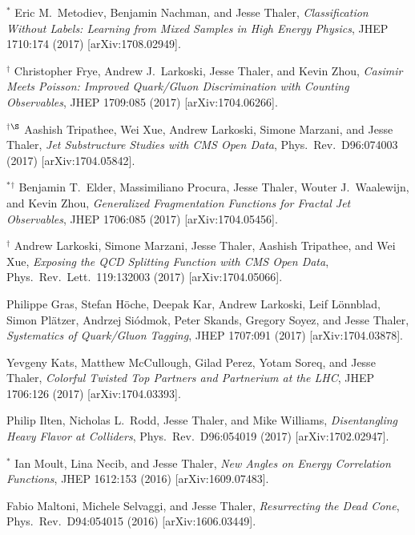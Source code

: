 \begin{list}{[]\addtocounter{jessecount}{-1}}{\leftmargin=3em \itemsep=4pt}
\item
${}^\ast$ Eric M.\ Metodiev, Benjamin Nachman, and Jesse Thaler,
\emph{Classification Without Labels: Learning from Mixed Samples in High Energy Physics},
JHEP 1710:174 (2017)
[arXiv:1708.02949].

\item
${}^\dagger$ Christopher Frye, Andrew J.\ Larkoski, Jesse Thaler, and Kevin Zhou,
\emph{Casimir Meets Poisson: Improved Quark/Gluon Discrimination with Counting Observables},
JHEP 1709:085 (2017)
[arXiv:1704.06266].

\item
${}^\dagger$${}^\S$ Aashish Tripathee, Wei Xue, Andrew Larkoski, Simone Marzani, and Jesse Thaler,
\emph{Jet Substructure Studies with CMS Open Data},
Phys.\ Rev.\ D96:074003 (2017)
[arXiv:1704.05842].

\item
${}^\ast$${}^\dagger$ Benjamin T.\ Elder, Massimiliano Procura, Jesse Thaler, Wouter J.\ Waalewijn, and Kevin Zhou,
\emph{Generalized Fragmentation Functions for Fractal Jet Observables},
JHEP 1706:085 (2017)
[arXiv:1704.05456].

\item
${}^\dagger$ Andrew Larkoski, Simone Marzani, Jesse Thaler, Aashish Tripathee, and Wei Xue,
\emph{Exposing the QCD Splitting Function with CMS Open Data},
Phys.\ Rev.\ Lett.\ 119:132003 (2017)
[arXiv:1704.05066].

\item
 Philippe Gras, Stefan Höche, Deepak Kar, Andrew Larkoski, Leif Lönnblad, Simon Plätzer, Andrzej Siódmok, Peter Skands, Gregory Soyez, and Jesse Thaler,
\emph{Systematics of Quark/Gluon Tagging},
JHEP 1707:091 (2017)
[arXiv:1704.03878].

\item
 Yevgeny Kats, Matthew McCullough, Gilad Perez, Yotam Soreq, and Jesse Thaler,
\emph{Colorful Twisted Top Partners and Partnerium at the LHC},
JHEP 1706:126 (2017)
[arXiv:1704.03393].

\item
 Philip Ilten, Nicholas L.\ Rodd, Jesse Thaler, and Mike Williams,
\emph{Disentangling Heavy Flavor at Colliders},
Phys.\ Rev.\ D96:054019 (2017)
[arXiv:1702.02947].

\item
${}^\ast$ Ian Moult, Lina Necib, and Jesse Thaler,
\emph{New Angles on Energy Correlation Functions},
JHEP 1612:153 (2016)
[arXiv:1609.07483].

\item
 Fabio Maltoni, Michele Selvaggi, and Jesse Thaler,
\emph{Resurrecting the Dead Cone},
Phys.\ Rev.\ D94:054015 (2016)
[arXiv:1606.03449].


\end{list}
